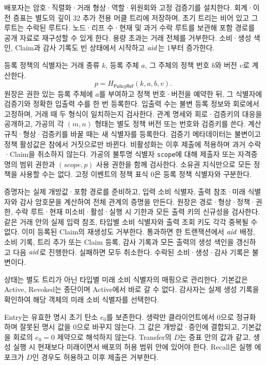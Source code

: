 배포자는 암호·직렬화·거래 형상·역할·위원회와 고정 검증기를 설치한다.
회계·이전 증표는 별도의 깊이 32 추가 전용 머클 트리에 저장하며,
초기 트리는 비어 있고 그 루트는 수락된 루트다.
노드·리프 수·현재 및 과거 수락 루트를 보관해 포함 경로를
공개 자료로 재구성할 수 있게 한다. 용량 초과는 거래 전체를 거부한다.
소비·생성 색인, Claim과 감사 기록도 빈 상태에서 시작하고
$\mathit{aid}$는 1부터 증가한다.

등록 정책의 식별자는 거래 종류 $k$, 등록 주체 $a$, 그 주체의
정책 번호 $b$와 버전 $v$로 계산한다.
\begin{equation}
 p=H_{\mathsf{PolicyRef}}(k,a,b,v).
 \label{eq:policy-ref}
\end{equation}
원장은 권한 있는 등록 주체에 $a$를 부여하고 정책 번호·버전을
예약한 뒤, 그 식별자에 검증기와 정확한 입출력 수를 한 번 등록한다.
입출력 수는 불변 등록 정보와 회로에서 고정하며,
거래 때 두 형식이 일치하는지 검사한다.
관계 명세와 회로·검증키의 대응을 공개하고,
가공의 각 $(m,n)$ 형태는 별도 정책 버전 또는 번호와 검증키를 쓴다.
계산 규칙·형상·검증키를 바꿀 때는 새 식별자를 등록한다.
검증기 메타데이터는 불변이고 정책 활성값은 참에서 거짓으로만 바뀐다.
비활성화는 이후 제출에 적용하며 과거 수락·Claim을 취소하지 않는다.
가공의 불투명 식별자 \texttt{scope}에 대해 제출자 또는 자격증명의
범위 권한과 $(scope,p)$ 사용 권한을 함께 검사한다.
소유권 지식만으로 모든 정책을 사용할 수는 없다.
고정 이벤트의 정책 표식 0은 등록 정책 식별자와 구분한다.

증명자는 실제 개방값·포함 경로를 준비하고,
입력 소비 식별자, 출력 참조·미래 식별자와 감사 암호문을 계산하여
전체 관계의 증명을 만든다. 원장은 경로·형상·정책·권한,
수락 루트·현재 미소비·활성·실행 시 기한과 모든 출력 키의 신규성을 검사한다.
같은 거래 안의 실제 입력 참조, 타입별 소비 식별자와 출력 조회 키도
각각 중복될 수 없다. 이미 등록된 Claim의 재생성도 거부한다.
통과하면 한 트랜잭션에서 $\mathit{aid}$ 배정, 소비 기록,
트리 추가 또는 Claim 등록, 감사 기록과 모든 출력의 생성 색인을
갱신하고 다음 $\mathit{aid}$로 진행한다. 실패하면 모두 취소한다.
수락된 소비·생성·감사 기록은 불변이다.

상태는 별도 트리가 아닌 타입별 미래 소비 식별자의 매핑으로 관리한다.
기본값은 Active, Revoked는 종단이며 Active에서 바로 갈 수 없다.
감사자는 실제 생성 기록을 확인하여 해당 객체의 미래 소비 식별자를 선택한다.

Entry는 유효한 명시 초기 탄소 $e_0$를 보존한다.
생략만 클라이언트에서 0으로 정규화하며 잘못된 명시 값을 0으로 바꾸지 않는다.
그 값은 개방값·증인에 결합되고, 기본값을 회로의 $e_0=0$ 제약으로
해석하지 않는다. Transfer의 $D$는 증표 안의 값과 같고,
생성 실행 시 현재보다 미래이면서 배포의 허용 범위 안에 있어야 한다.
Recall은 실행 에포크가 $D$인 경우도 허용하고 이후 제출은 거부한다.

